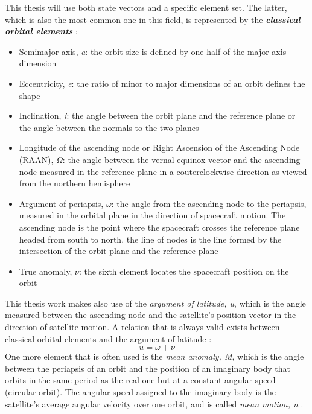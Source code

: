 This thesis will use both state vectors and a specific element set.
The latter, which is also the most common one in this field, is represented by the \textit{\textbf{classical orbital elements}} \cite{brown1998spacecraft}:
\begin{itemize}
    \item Semimajor axis, \textit{a}: the orbit size is defined by one half of the major axis dimension
    \item Eccentricity, \textit{e}: the ratio of minor to major dimensions of an orbit defines the shape
    \item Inclination, \textit{i}: the angle between the orbit plane and the reference plane or the angle between the normals to the two planes
    \item Longitude of the ascending node or Right Ascension of the Ascending Node (RAAN), $\Omega$: the angle between the vernal equinox vector and the ascending node measured in the reference plane in a couterclockwise direction as viewed from the northern hemisphere
    \item Argument of periapsis, $\omega$: the angle from the ascending node to the periapsis, measured in the orbital plane in the direction of spacecraft motion. The ascending node is the point where the spacecraft crosses the reference plane headed from south to north. the line of nodes is the line formed by the intersection of the orbit plane and the reference plane
    \item True anomaly, $\nu$: the sixth element locates the spacecraft position on the orbit
\end{itemize}


This thesis work makes also use of the \textit{argument of latitude, u}, which is the angle measured between the ascending node and the satellite's position vector in the direction of satellite motion.
A relation that is always valid exists between classical orbital elements and the argument of latitude \cite{vallado2013fundamentals}:
\begin{equation} \label{eq:argl}
    u = \omega + \nu
\end{equation}
One more element that is often used is the \textit{mean anomaly, M}, which is the angle between the periapsis of an orbit and the position of an imaginary body that orbits in the same period as the real one but at a constant angular speed (circular orbit).
The angular speed assigned to the imaginary body is the satellite's average angular velocity over one orbit, and is called \textit{mean motion, n} \cite{ridpath2012dictionary}.

